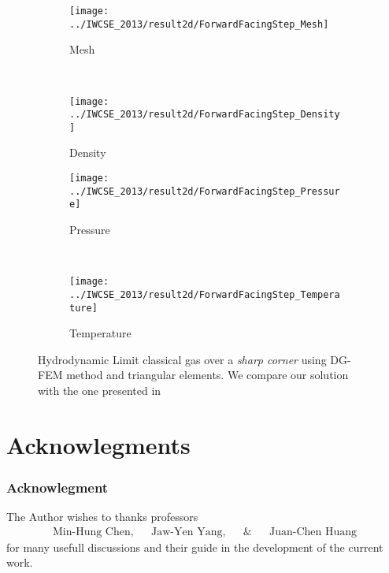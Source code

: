 \begin{frame}
	\begin{figure}
        \centering
        \begin{subfigure}[b]{0.45\textwidth}
                \centering
                \texttt{[image: ../IWCSE\_2013/result2d/ForwardFacingStep\_Mesh]}
                \caption{Mesh}
                \label{FFS_mesh}
        \end{subfigure}%
				~
        \begin{subfigure}[b]{0.45\textwidth}
                \centering
                \texttt{[image: ../IWCSE\_2013/result2d/ForwardFacingStep\_Density]}
                \caption{Density}
                \label{fig:FFS_Density}
        \end{subfigure}
				
        \begin{subfigure}[b]{0.45\textwidth}
								\centering
                \texttt{[image: ../IWCSE\_2013/result2d/ForwardFacingStep\_Pressure]}
                \caption{Pressure}
                \label{fig:FFS_Pressure}
        \end{subfigure}
				~
        \begin{subfigure}[b]{0.45\textwidth}
								\centering
                \texttt{[image: ../IWCSE\_2013/result2d/ForwardFacingStep\_Temperature]}
                \caption{Temperature}
                \label{fig:FFS_temperaute}
        \end{subfigure}
				\caption{Hydrodynamic Limit classical gas over a \emph{sharp corner} using DG-FEM method and triangular elements. We compare our solution with the one presented in \cite{Qiu:2005:RDG:1046640.1046665}}
				\label{fig:FFD_DG-FEM}
\end{figure}
\end{frame}

\section[]{Acknowlegments}
\begin{frame} \frametitle{Acknowlegment}
The Author wishes to thanks professors
\begin{align*}
&\text{Min-Hung Chen,}& &\text{Jaw-Yen Yang,}& &\text{\&}& &\text{Juan-Chen Huang}&
\end{align*}
for many usefull discussions and their guide in the development of the current work.
\end{frame}